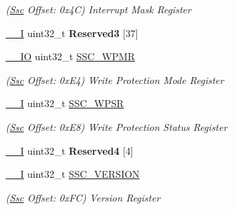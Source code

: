 \begin{DoxyCompactItemize}
\begin{DoxyCompactList}\small\item\em (\mbox{\hyperlink{structSsc}{Ssc}} Offset\+: 0x4C) Interrupt Mask Register \end{DoxyCompactList}\item 
\mbox{\label{structSsc_aa23f24a509a2a8e539c2442b6e92be9b}} 
\mbox{\hyperlink{core__cm7_8h_af63697ed9952cc71e1225efe205f6cd3}{\+\_\+\+\_\+I}} uint32\+\_\+t {\bfseries Reserved3} \mbox{[}37\mbox{]}
\item 
\mbox{\label{structSsc_a963fdab03750806b6ef321149e8d6082}} 
\mbox{\hyperlink{core__cm7_8h_aec43007d9998a0a0e01faede4133d6be}{\+\_\+\+\_\+\+IO}} uint32\+\_\+t \mbox{\hyperlink{structSsc_a963fdab03750806b6ef321149e8d6082}{S\+S\+C\+\_\+\+W\+P\+MR}}
\begin{DoxyCompactList}\small\item\em (\mbox{\hyperlink{structSsc}{Ssc}} Offset\+: 0x\+E4) Write Protection Mode Register \end{DoxyCompactList}\item 
\mbox{\label{structSsc_a8fd85699562e502be5ed95802e3a8f54}} 
\mbox{\hyperlink{core__cm7_8h_af63697ed9952cc71e1225efe205f6cd3}{\+\_\+\+\_\+I}} uint32\+\_\+t \mbox{\hyperlink{structSsc_a8fd85699562e502be5ed95802e3a8f54}{S\+S\+C\+\_\+\+W\+P\+SR}}
\begin{DoxyCompactList}\small\item\em (\mbox{\hyperlink{structSsc}{Ssc}} Offset\+: 0x\+E8) Write Protection Status Register \end{DoxyCompactList}\item 
\mbox{\label{structSsc_a85d4593c545f11757314615a2bccaaca}} 
\mbox{\hyperlink{core__cm7_8h_af63697ed9952cc71e1225efe205f6cd3}{\+\_\+\+\_\+I}} uint32\+\_\+t {\bfseries Reserved4} \mbox{[}4\mbox{]}
\item 
\mbox{\label{structSsc_aed7ed4dfafb83518da7cce96e3d2c60d}} 
\mbox{\hyperlink{core__cm7_8h_af63697ed9952cc71e1225efe205f6cd3}{\+\_\+\+\_\+I}} uint32\+\_\+t \mbox{\hyperlink{structSsc_aed7ed4dfafb83518da7cce96e3d2c60d}{S\+S\+C\+\_\+\+V\+E\+R\+S\+I\+ON}}
\begin{DoxyCompactList}\small\item\em (\mbox{\hyperlink{structSsc}{Ssc}} Offset\+: 0x\+FC) Version Register \end{DoxyCompactList}\end{DoxyCompactItemize}


